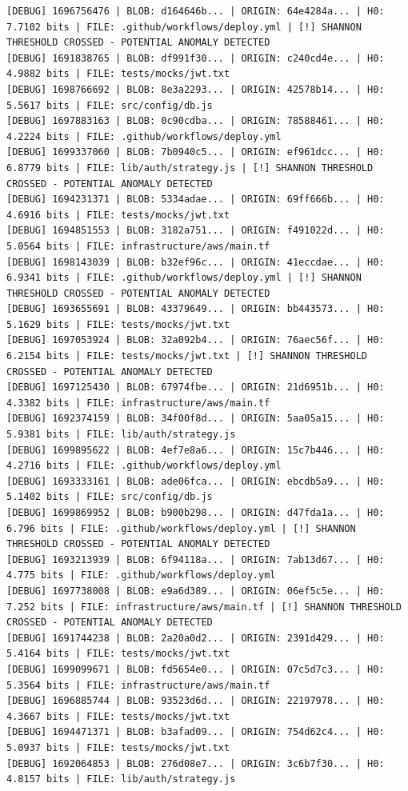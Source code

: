 \documentclass[12pt, a4paper, oneside]{report}
\begin{document}
\begin{lstlisting}[basicstyle=\tiny\ttfamily]
[DEBUG] 1696756476 | BLOB: d164646b... | ORIGIN: 64e4284a... | H0: 7.7102 bits | FILE: .github/workflows/deploy.yml | [!] SHANNON THRESHOLD CROSSED - POTENTIAL ANOMALY DETECTED
[DEBUG] 1691838765 | BLOB: df991f30... | ORIGIN: c240cd4e... | H0: 4.9882 bits | FILE: tests/mocks/jwt.txt
[DEBUG] 1698766692 | BLOB: 8e3a2293... | ORIGIN: 42578b14... | H0: 5.5617 bits | FILE: src/config/db.js
[DEBUG] 1697883163 | BLOB: 0c90cdba... | ORIGIN: 78588461... | H0: 4.2224 bits | FILE: .github/workflows/deploy.yml
[DEBUG] 1699337060 | BLOB: 7b0940c5... | ORIGIN: ef961dcc... | H0: 6.8779 bits | FILE: lib/auth/strategy.js | [!] SHANNON THRESHOLD CROSSED - POTENTIAL ANOMALY DETECTED
[DEBUG] 1694231371 | BLOB: 5334adae... | ORIGIN: 69ff666b... | H0: 4.6916 bits | FILE: tests/mocks/jwt.txt
[DEBUG] 1694851553 | BLOB: 3182a751... | ORIGIN: f491022d... | H0: 5.0564 bits | FILE: infrastructure/aws/main.tf
[DEBUG] 1698143039 | BLOB: b32ef96c... | ORIGIN: 41eccdae... | H0: 6.9341 bits | FILE: .github/workflows/deploy.yml | [!] SHANNON THRESHOLD CROSSED - POTENTIAL ANOMALY DETECTED
[DEBUG] 1693655691 | BLOB: 43379649... | ORIGIN: bb443573... | H0: 5.1629 bits | FILE: tests/mocks/jwt.txt
[DEBUG] 1697053924 | BLOB: 32a092b4... | ORIGIN: 76aec56f... | H0: 6.2154 bits | FILE: tests/mocks/jwt.txt | [!] SHANNON THRESHOLD CROSSED - POTENTIAL ANOMALY DETECTED
[DEBUG] 1697125430 | BLOB: 67974fbe... | ORIGIN: 21d6951b... | H0: 4.3382 bits | FILE: infrastructure/aws/main.tf
[DEBUG] 1692374159 | BLOB: 34f00f8d... | ORIGIN: 5aa05a15... | H0: 5.9381 bits | FILE: lib/auth/strategy.js
[DEBUG] 1699895622 | BLOB: 4ef7e8a6... | ORIGIN: 15c7b446... | H0: 4.2716 bits | FILE: .github/workflows/deploy.yml
[DEBUG] 1693333161 | BLOB: ade06fca... | ORIGIN: ebcdb5a9... | H0: 5.1402 bits | FILE: src/config/db.js
[DEBUG] 1699869952 | BLOB: b900b298... | ORIGIN: d47fda1a... | H0: 6.796 bits | FILE: .github/workflows/deploy.yml | [!] SHANNON THRESHOLD CROSSED - POTENTIAL ANOMALY DETECTED
[DEBUG] 1693213939 | BLOB: 6f94118a... | ORIGIN: 7ab13d67... | H0: 4.775 bits | FILE: .github/workflows/deploy.yml
[DEBUG] 1697738008 | BLOB: e9a6d389... | ORIGIN: 06ef5c5e... | H0: 7.252 bits | FILE: infrastructure/aws/main.tf | [!] SHANNON THRESHOLD CROSSED - POTENTIAL ANOMALY DETECTED
[DEBUG] 1691744238 | BLOB: 2a20a0d2... | ORIGIN: 2391d429... | H0: 5.4164 bits | FILE: tests/mocks/jwt.txt
[DEBUG] 1699099671 | BLOB: fd5654e0... | ORIGIN: 07c5d7c3... | H0: 5.3564 bits | FILE: infrastructure/aws/main.tf
[DEBUG] 1696885744 | BLOB: 93523d6d... | ORIGIN: 22197978... | H0: 4.3667 bits | FILE: tests/mocks/jwt.txt
[DEBUG] 1694471371 | BLOB: b3afad09... | ORIGIN: 754d62c4... | H0: 5.0937 bits | FILE: tests/mocks/jwt.txt
[DEBUG] 1692064853 | BLOB: 276d08e7... | ORIGIN: 3c6b7f30... | H0: 4.8157 bits | FILE: lib/auth/strategy.js
\end{lstlisting}
\end{document}
